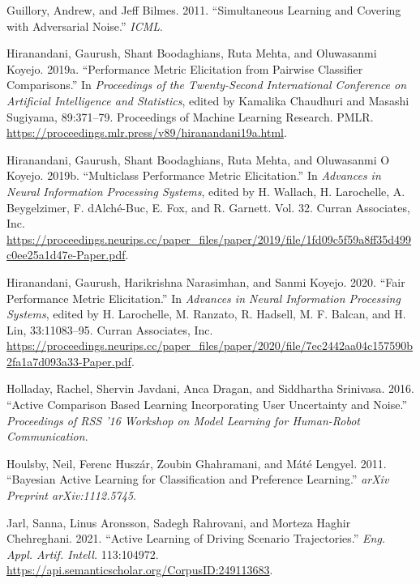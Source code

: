 \documentclass[
  letterpaper,
  numbers=noenddot,
  DIV=11]{scrreprt}
\newlength{\cslhangindent}
\newenvironment{CSLReferences}[2] %
 {\begin{list}{}{%
  \setlength{\itemindent}{0pt}
  \setlength{\leftmargin}{0pt}
  \setlength{\parsep}{0pt}
  \ifodd #1
   \setlength{\leftmargin}{\cslhangindent}
   \setlength{\itemindent}{-1\cslhangindent}
  \fi
  \setlength{\itemsep}{#2\baselineskip}}}
 {\end{list}}
\theoremstyle{plain}
\theoremstyle{definition}
\theoremstyle{remark}
\begin{document}
\begin{CSLReferences}{1}{0}
Guillory, Andrew, and Jeff Bilmes. 2011. {``Simultaneous Learning and
Covering with Adversarial Noise.''} \emph{ICML}.

Hiranandani, Gaurush, Shant Boodaghians, Ruta Mehta, and Oluwasanmi
Koyejo. 2019a. {``Performance Metric Elicitation from Pairwise
Classifier Comparisons.''} In \emph{Proceedings of the Twenty-Second
International Conference on Artificial Intelligence and Statistics},
edited by Kamalika Chaudhuri and Masashi Sugiyama, 89:371--79.
Proceedings of Machine Learning Research. PMLR.
\url{https://proceedings.mlr.press/v89/hiranandani19a.html}.

Hiranandani, Gaurush, Shant Boodaghians, Ruta Mehta, and Oluwasanmi O
Koyejo. 2019b. {``Multiclass Performance Metric Elicitation.''} In
\emph{Advances in Neural Information Processing Systems}, edited by H.
Wallach, H. Larochelle, A. Beygelzimer, F. dAlché-Buc, E. Fox, and R.
Garnett. Vol. 32. Curran Associates, Inc.
\url{https://proceedings.neurips.cc/paper_files/paper/2019/file/1fd09c5f59a8ff35d499c0ee25a1d47e-Paper.pdf}.

Hiranandani, Gaurush, Harikrishna Narasimhan, and Sanmi Koyejo. 2020.
{``Fair Performance Metric Elicitation.''} In \emph{Advances in Neural
Information Processing Systems}, edited by H. Larochelle, M. Ranzato, R.
Hadsell, M. F. Balcan, and H. Lin, 33:11083--95. Curran Associates, Inc.
\url{https://proceedings.neurips.cc/paper_files/paper/2020/file/7ec2442aa04c157590b2fa1a7d093a33-Paper.pdf}.

Holladay, Rachel, Shervin Javdani, Anca Dragan, and Siddhartha
Srinivasa. 2016. {``Active Comparison Based Learning Incorporating User
Uncertainty and Noise.''} \emph{Proceedings of RSS '16 Workshop on Model
Learning for Human-Robot Communication}.

Houlsby, Neil, Ferenc Huszár, Zoubin Ghahramani, and Máté Lengyel. 2011.
{``Bayesian Active Learning for Classification and Preference
Learning.''} \emph{arXiv Preprint arXiv:1112.5745}.

Jarl, Sanna, Linus Aronsson, Sadegh Rahrovani, and Morteza Haghir
Chehreghani. 2021. {``Active Learning of Driving Scenario
Trajectories.''} \emph{Eng. Appl. Artif. Intell.} 113:104972.
\url{https://api.semanticscholar.org/CorpusID:249113683}.


\end{CSLReferences}
\end{document}
